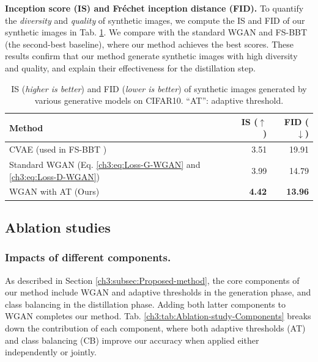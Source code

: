 \begin{foldable}
\textbf{Inception score (IS) and Fr\'{e}chet inception distance (FID).} To quantify the \textit{diversity} and \textit{quality} of synthetic images, we compute the IS \cite{salimans2016improved} and FID \cite{heusel2017gans} of our synthetic images in Tab. \ref{ch3:tab:IS-FID}.
We compare with the standard WGAN and FS-BBT (the second-best baseline), where our method achieves the best scores.
These results confirm that our method generate synthetic images with high diversity and quality, and explain their effectiveness for the distillation step.
\end{foldable}

\begin{table}
    \centering
    \caption{IS (\textit{higher is better}) and FID (\textit{lower is better}) of synthetic images generated by various generative models on CIFAR10. ``AT'': adaptive threshold.}
    \label{ch3:tab:IS-FID}
    \begin{tabular}{|l|r|r|}
        \hline
        \textbf{Method} & \textbf{IS ($\uparrow$)} & \textbf{FID ($\downarrow$)}\\
        \hline
        CVAE (used in FS-BBT \cite{nguyen2022black})                      & 3.51          & 19.91\\
        Standard WGAN (Eq. \ref{ch3:eq:Loss-G-WGAN} and \ref{ch3:eq:Loss-D-WGAN}) & 3.99          & 14.79\\
        WGAN with AT (Ours)                                               & \textbf{4.42} & \textbf{13.96}\\
    \end{tabular}
\end{table}


\subsection{Ablation studies}

\subsubsection{Impacts of different components.}
\begin{foldable}
As described in Section \ref{ch3:subsec:Proposed-method}, the core components of our method include WGAN and adaptive thresholds in the generation phase, and class balancing in the distillation phase.
Adding both latter components to WGAN completes our method.
Tab. \ref{ch3:tab:Ablation-study-Components} breaks down the contribution of each component, where both adaptive thresholds (AT) and class balancing (CB) improve our accuracy when applied either independently or jointly.
\end{foldable}

